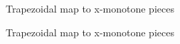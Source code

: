 \def\CTeXPreproc{Created by ctex v0.2.14, don't edit!}\documentclass[11pt]{article}
\begin{document}
\begin{figure}[!h]
\begin{center}
\caption{Trapezoidal map to x-monotone pieces}
\end{center}
\end{figure}

\begin{figure}[!h]
\begin{center}
\caption{Trapezoidal map to x-monotone pieces}
\end{center}
\end{figure}
\end{document}
